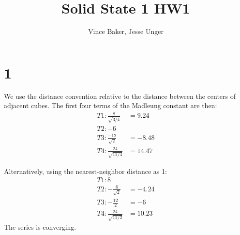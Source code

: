 \documentclass[a4paper,11pt]{article}
\title{Solid State 1 HW1}
\author{Vince Baker, Jesse Unger}
\numberwithin{equation}{section}
\begin{document}
\maketitle

\section*{1}
We use the distance convention relative to the distance between the centers of adjacent cubes. 
The first four terms of the Madleung constant are then:
\begin{align}
 T1: \frac{8}{\sqrt{3/4}} &= 9.24\\
 T2: -6\\
 T3: \frac{-12}{\sqrt{2}} &= -8.48\\
 T4: \frac{24}{\sqrt{11/4}} &= 14.47
\end{align}

Alternatively, using the nearest-neighbor distance as 1:
\begin{align}
 T1: 8\\
 T2: -\frac{6}{\sqrt{2}} &= -4.24\\
 T3: -\frac{12}{2} &= -6\\
 T4: \frac{24}{\sqrt{11/2}} &= 10.23
\end{align}
The series is converging.
\end{document}
